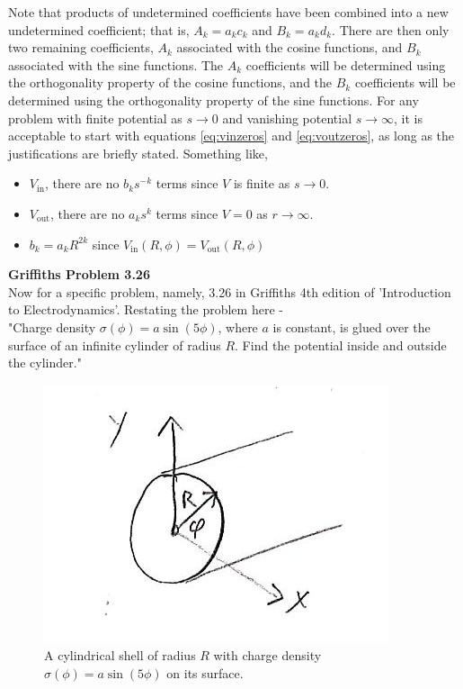 \documentclass[12pt]{article}
\begin{document}
\begin{flushleft}
Note that products of undetermined coefficients have been combined into a new undetermined coefficient; that is, $A_{k}=a_{k}c_{k}$ and $B_{k}=a_{k}d_{k}$.  There are then only two remaining coefficients, $A_{k}$ associated with the cosine functions, and $B_{k}$ associated with the sine functions.  The $A_{k}$ coefficients will be determined using the orthogonality property of the cosine functions, and the $B_{k}$ coefficients will be determined using the orthogonality property of the sine functions.  For any problem with finite potential as $s\rightarrow 0$ and vanishing potential $s\rightarrow \infty$, it is acceptable to start with equations \ref{eq:vinzeros} and \ref{eq:voutzeros}, as long as the justifications are briefly stated.  Something like,
\begin{itemize}
\item $V_{\text{in}}$, there are no $b_{k}s^{-k}$ terms since $V$ is finite as $s\rightarrow 0$. \\
\item $V_{\text{out}}$, there are no $a_{k}s^{k}$ terms since $V=0$ as $r\rightarrow \infty$. \\
\item $b_{k} = a_{k}R^{2k}$ since $V_{\text{in}}(R,\phi)=V_{\text{out}}(R,\phi)$
\end{itemize}

\textbf{\color{myblue} Griffiths Problem 3.26}\\
Now for a specific problem, namely, 3.26 in Griffiths 4th edition of 'Introduction to Electrodynamics'.  Restating the problem here - \\
\vspace{.1in}
 "Charge density $\sigma(\phi)=a\sin{(5\phi)}$, where $a$ is constant, is glued over the surface of an infinite cylinder of radius $R$.  Find the potential inside and outside the cylinder."
 
\begin{figure}[h]
\centering
\includegraphics*[trim=0cm 0cm 0cm 0cm, clip=true, width=0.3\columnwidth]{cylwcharge.png}
\caption{\small A cylindrical shell of radius $R$ with charge density $\sigma(\phi)=a\sin{(5\phi)}$ on its surface.}
\label{fig:cylofcharge}
\end{figure}


\end{flushleft}
\end{document}
